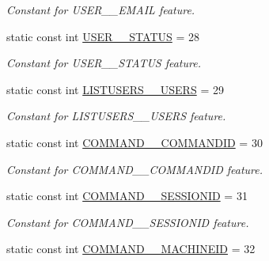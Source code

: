 \begin{DoxyCompactItemize}
\begin{DoxyCompactList}\small\item\em Constant for USER\_\-\_\-EMAIL feature. \item\end{DoxyCompactList}\item 
\hypertarget{classUMS__Data_1_1UMS__DataPackage_a3c4d857fa9111f78b9470786610cc38f}{
static const int \hyperlink{classUMS__Data_1_1UMS__DataPackage_a3c4d857fa9111f78b9470786610cc38f}{USER\_\-\_\-STATUS} = 28}
\label{classUMS__Data_1_1UMS__DataPackage_a3c4d857fa9111f78b9470786610cc38f}

\begin{DoxyCompactList}\small\item\em Constant for USER\_\-\_\-STATUS feature. \item\end{DoxyCompactList}\item 
\hypertarget{classUMS__Data_1_1UMS__DataPackage_a970048f08cb0d87702834e2b5a898183}{
static const int \hyperlink{classUMS__Data_1_1UMS__DataPackage_a970048f08cb0d87702834e2b5a898183}{LISTUSERS\_\-\_\-USERS} = 29}
\label{classUMS__Data_1_1UMS__DataPackage_a970048f08cb0d87702834e2b5a898183}

\begin{DoxyCompactList}\small\item\em Constant for LISTUSERS\_\-\_\-USERS feature. \item\end{DoxyCompactList}\item 
\hypertarget{classUMS__Data_1_1UMS__DataPackage_ad310f27f63dbf45d574898c2d03e8ca5}{
static const int \hyperlink{classUMS__Data_1_1UMS__DataPackage_ad310f27f63dbf45d574898c2d03e8ca5}{COMMAND\_\-\_\-COMMANDID} = 30}
\label{classUMS__Data_1_1UMS__DataPackage_ad310f27f63dbf45d574898c2d03e8ca5}

\begin{DoxyCompactList}\small\item\em Constant for COMMAND\_\-\_\-COMMANDID feature. \item\end{DoxyCompactList}\item 
\hypertarget{classUMS__Data_1_1UMS__DataPackage_ae1959c1bd3868faaa9ba22adc24c9646}{
static const int \hyperlink{classUMS__Data_1_1UMS__DataPackage_ae1959c1bd3868faaa9ba22adc24c9646}{COMMAND\_\-\_\-SESSIONID} = 31}
\label{classUMS__Data_1_1UMS__DataPackage_ae1959c1bd3868faaa9ba22adc24c9646}

\begin{DoxyCompactList}\small\item\em Constant for COMMAND\_\-\_\-SESSIONID feature. \item\end{DoxyCompactList}\item 
\hypertarget{classUMS__Data_1_1UMS__DataPackage_a84cf5ed3f59007f891167c33f1e02a1c}{
static const int \hyperlink{classUMS__Data_1_1UMS__DataPackage_a84cf5ed3f59007f891167c33f1e02a1c}{COMMAND\_\-\_\-MACHINEID} = 32}
\label{classUMS__Data_1_1UMS__DataPackage_a84cf5ed3f59007f891167c33f1e02a1c}


\end{DoxyCompactItemize}

